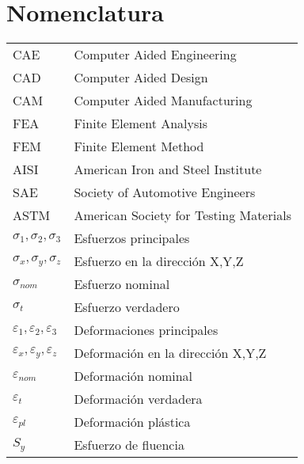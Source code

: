 \chapter*{Nomenclatura}




\begin{table}[h]
\def\arraystretch{1.15}
\begin{tabular}{p{4cm} p{12cm}}

CAE      &                       		      Computer Aided Engineering \\
CAD &                                  		  Computer Aided Design \\
CAM & 										  Computer Aided Manufacturing \\
FEA &                                  		  Finite Element Analysis \\
FEM & 							              Finite Element Method \\
AISI &                                        American Iron and Steel Institute \\
SAE &                                         Society of Automotive Engineers \\
ASTM &                                        American Society for Testing Materials \\
$\sigma_1, \sigma_2, \sigma_3$ &              Esfuerzos principales \\
$\sigma_x, \sigma_y, \sigma_z$ &			  Esfuerzo en la dirección X,Y,Z \\
$\sigma_{nom}$ & 							  Esfuerzo nominal \\
$\sigma_{t}$ & 								  Esfuerzo verdadero \\
$\varepsilon_1, \varepsilon_2, \varepsilon_3$ & Deformaciones principales \\
$\varepsilon_x, \varepsilon_y, \varepsilon_z$ & Deformación en la dirección X,Y,Z \\
$\varepsilon_{nom} $ &						  Deformación nominal \\
$\varepsilon_{t}$ &  						  Deformación verdadera \\
$\varepsilon_{pl}$ & 						  Deformación plástica \\
$ S_y $ &                                     Esfuerzo de fluencia \\

\end{tabular}
\end{table}
